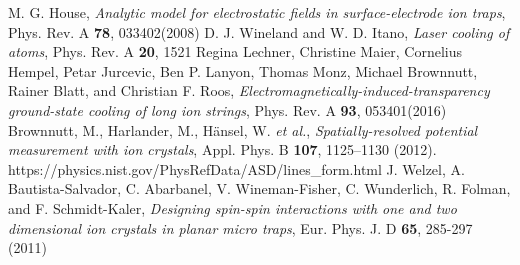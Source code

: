 \begin{thebibliography}{99}
	 M. G. House, \textit{Analytic model for electrostatic fields in surface-electrode ion traps}, Phys. Rev. A \textbf{78}, 033402(2008)
	 D. J. Wineland and W. D. Itano, \textit{Laser cooling of atoms}, Phys. Rev. A \textbf{20}, 1521
	 Regina Lechner, Christine Maier, Cornelius Hempel, Petar Jurcevic, Ben P. Lanyon, Thomas Monz, Michael Brownnutt, Rainer Blatt, and Christian F. Roos, \textit{Electromagnetically-induced-transparency ground-state cooling of long ion strings}, Phys. Rev. A \textbf{93}, 053401(2016)
	 Brownnutt, M., Harlander, M., Hänsel, W. \textit{et al.}, \textit{Spatially-resolved potential measurement with ion crystals}, Appl. Phys. B \textbf{107}, 1125–1130 (2012).
	 https://physics.nist.gov/PhysRefData/ASD/lines\_form.html
	 J. Welzel, A. Bautista-Salvador, C. Abarbanel, V. Wineman-Fisher, C. Wunderlich, R. Folman, and F. Schmidt-Kaler, \textit{Designing spin-spin interactions with one and two dimensional ion crystals in planar micro traps}, Eur. Phys. J. D \textbf{65}, 285-297 (2011)
\end{thebibliography}
